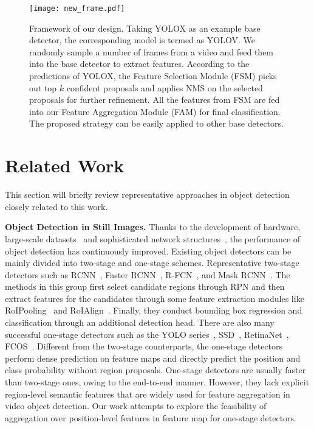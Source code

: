 \documentclass[letterpaper]{article} \usepackage{aaai23}  \usepackage{times}  \usepackage{helvet}  \usepackage{courier}  \usepackage[hyphens]{url}  \usepackage{graphicx} \urlstyle{rm} \def\UrlFont{\rm}  \usepackage{natbib}  \usepackage{caption} \usepackage{xcolor}
\begin{document}
\begin{figure*}[t]
\centering
\texttt{[image: new\_frame.pdf]}
\caption{Framework of our design. Taking YOLOX as an example base detector, the corresponding model is termed as YOLOV. We randomly sample a number of frames from a video and feed them into the base detector to extract features. According to the predictions of YOLOX, the Feature Selection Module (FSM) picks out top $k$ confident proposals and applies NMS on the selected proposals for further refinement. All the features from FSM are fed into our Feature Aggregation Module (FAM) for final classification. The proposed strategy can be easily applied to other base detectors.}
\label{fig:yolov}
\end{figure*}

\section{Related Work}
This section will briefly review representative approaches in object detection closely related to this work.

\noindent
\textbf{Object Detection in Still Images.} Thanks to the development of hardware, large-scale datasets~\cite{lin2014microsoft,krizhevsky2012imagenet} and sophisticated network structures~\cite{simonyan2014very,he2016deep,xie2017aggregated,wang2020cspnet}, the performance of object detection has continuously improved. Existing object detectors can be mainly divided into two-stage and one-stage schemes. Representative two-stage detectors such as RCNN~\cite{girshick2014rich}, Faster RCNN~\cite{ren2015faster}, R-FCN~\cite{dai2016r}, and Mask RCNN~\cite{he2017mask}. The methods in this group first select candidate regions through RPN and then extract features for the candidates through some feature extraction modules like RoIPooling~\cite{ren2015faster} and RoIAlign~\cite{he2017mask}. Finally, they conduct bounding box regression and classification through an additional detection head. There are also many successful one-stage detectors such as the YOLO series~\cite{redmon2016you,redmon2017yolo9000,bochkovskiy2020yolov4,ge2021yolox}, SSD~\cite{liu2016ssd}, RetinaNet~\cite{lin2017focal}, FCOS~\cite{tian2019fcos}. Different from the two-stage counterparts, the one-stage detectors perform dense prediction on feature maps and directly predict the position and class probability without region proposals.
One-stage detectors are usually faster than two-stage ones, owing to the end-to-end manner. However, they lack explicit region-level semantic features that are widely used for feature aggregation in video object detection. Our work attempts to explore the feasibility of aggregation over position-level features in feature map for one-stage detectors.
\end{document}

